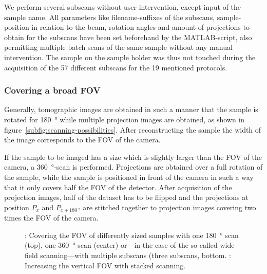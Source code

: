 We perform several subscans without user intervention, except input of the sample name. All parameters like filename-suffixes of the subscans, sample-position in relation to the beam, rotation angles and amount of projections to obtain for the subscans have been set beforehand by the MATLAB-script, also permitting multiple batch scans of the same sample without any manual intervention. The sample on the sample holder was thus not touched during the acquisition of the 57 different subscans for the 19 mentioned protocols. 

\subsubsection{Covering a broad FOV}
\label{subsec:covering a broad fov}
Generally, tomographic images are obtained in such a manner that the sample is rotated for \SI{180}{\degree} while multiple projection images are obtained, as shown in figure~\ref{subfig:scanning-possibilities}. After reconstructing the sample the width of the image corresponds to the FOV of the camera.

If the sample to be imaged has a size which is slightly larger than the FOV of the camera, a \SI{360}{\degree}-scan is performed. Projections are obtained over a full rotation of the sample, while the sample is positioned in front of the camera in such a way that it only covers half the FOV of the detector. After acquisition of the projection images, half of the dataset has to be flipped and the projections at position $P_{x}$ and $P_{x+\SI{180}{\degree}}$ are stitched together to projection images covering two times the FOV of the camera.

\begin{figure*}
	\noindent{}%
	\caption[Covering the FOV of differently sized samples]{: Covering the FOV of differently sized samples with one \SI{180}{\degree} scan (top), one \SI{360}{\degree} scan (center) or---in the case of the so called wide field scanning---with multiple subscans (three subscans, bottom. : Increasing the vertical FOV with stacked scanning.
	}%
	\label{fig:scanning-possibilities}%
\end{figure*}

